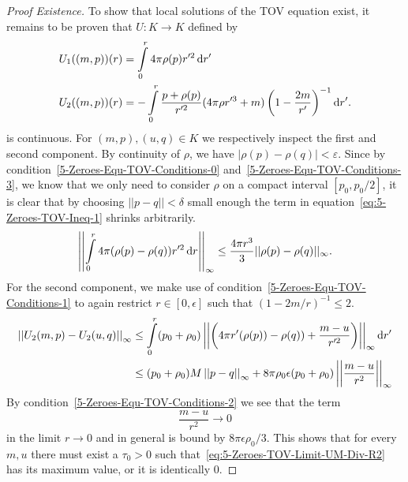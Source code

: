 \begin{proof}[Proof  Existence]
	To show that local solutions of the \ac{TOV} equation exist, it remains to be proven that $U:K\rightarrow K$ defined by
	\begin{align}
		U_1((m,p))(r) &= \int\limits_0^r 4\pi\rho(p) r'^2 \mathop{}\!\mathrm{d} r'
		\label{eq:5-Zeroes-TOV-Operator-Def-1}\\
		U_2((m,p))(r) &= -\int\limits_0^r\frac{p+\rho(p)}{r'^2}(4\pi\rho r'^3 + m)\left(1-\frac{2m}{r'}\right)^{-1}\mathop{}\!\mathrm{d} r'
		\label{eq:5-Zeroes-TOV-Operator-Def-2}.
	\end{align}
	is continuous.
	For $(m,p),(u,q)\in K$ we respectively inspect the first and second component.
	By continuity of $\rho$, we have $|\rho(p)-\rho(q)|<\varepsilon$.
	Since by condition~\eqref{5-Zeroes-Equ-TOV-Conditions-0} and~\eqref{5-Zeroes-Equ-TOV-Conditions-3}, we know that we only need to consider $\rho$ on a compact interval $[p_0,p_0/2]$, it is clear that by choosing $||p-q||<\delta$ small enough the term in equation~\eqref{eq:5-Zeroes-TOV-Ineq-1} shrinks arbitrarily.
	\begin{equation}
		\left|\left|\int\limits_0^r 4\pi(\rho(p)-\rho(q))r'^2\mathop{}\!\mathrm{d} r\right|\right|_\infty\leq \frac{4\pi r^3}{3}||\rho(p)-\rho(q)||_\infty.
		\label{eq:5-Zeroes-TOV-Ineq-1}
	\end{equation}
	For the second component, we make use of condition~\eqref{5-Zeroes-Equ-TOV-Conditions-1} to again restrict $r\in[0,\epsilon]$ such that $(1-2m/r)^{-1}\leq2$.
	\begin{align}
		\left|\left|U_2(m,p)-U_2(u,q)\right|\right|_\infty &\leq \int\limits_0^r(p_0+\rho_0)\left|\left|\left(4\pi r'(\rho(p))-\rho(q))+\frac{m-u}{r'^2}\right)\right|\right|_\infty\mathop{}\!\mathrm{d} r'\\
		&\leq (p_0+\rho_0)M\left|\left|p-q\right|\right|_\infty + 8\pi\rho_0\epsilon(p_0+\rho_0)\left|\left|\frac{m-u}{r^2}\right|\right|_\infty
		\label{eq:5-Zeroes-TOV-Ineq-2}
	\end{align}
	By condition~\eqref{5-Zeroes-Equ-TOV-Conditions-2} we see that the term
	\begin{equation}
		\frac{m-u}{r^2}\rightarrow0
		\label{eq:5-Zeroes-TOV-Limit-UM-Div-R2}
	\end{equation}
	in the limit $r\rightarrow0$ and in general is bound by $8\pi\epsilon\rho_0/3$.
	This shows that for every $m,u$ there must exist a $\tau_0>0$ such that~\eqref{eq:5-Zeroes-TOV-Limit-UM-Div-R2} has its maximum value, or it is identically $0$.

\end{proof}
